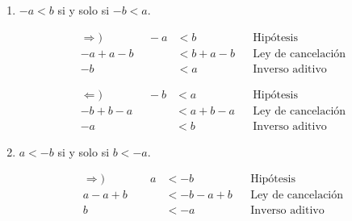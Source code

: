 \documentclass[11pt]{article}
\begin{document}
\begin{enumerate}[label=\alph*)]
\begin{enumerate}[label=\roman*)]
\begin{center}
        \end{center}
        \item $-a<b$ si y solo si $-b<a$.
        \begin{center}\vspace{-1em}
        \begin{minipage}[l]{.5\linewidth}
            \begin{align*}
                \Rightarrow) \qquad \qquad -a &< b && \text{Hipótesis}\\
                -a+a-b &< b +a-b && \text{Ley de cancelación}\\
                -b &< a && \text{Inverso aditivo}
            \end{align*}
        \end{minipage}%
        \begin{minipage}[r]{.5\linewidth}
            \begin{align*}
                \Leftarrow) \qquad \qquad   -b &< a && \text{Hipótesis}\\
                -b + b-a &< a + b-a && \text{Ley de cancelación}\\
                -a &< b && \text{Inverso aditivo}
            \end{align*}
        \end{minipage}
        \end{center}
        \item $a<-b$ si y solo si $b<-a$.
        \begin{center}\vspace{-1em}
        \begin{minipage}[l]{.5\linewidth}
            \begin{align*}
                \Rightarrow) \qquad \qquad
                a &< -b && \text{Hipótesis}\\
                a - a + b &< -b -a +b && \text{Ley de cancelación}\\
                b &< -a && \text{Inverso aditivo}
            \end{align*}
        \end{minipage}%
        \begin{minipage}[r]{.5\linewidth}

\end{minipage}
\end{center}
\end{enumerate}
\end{enumerate}
\end{document}
